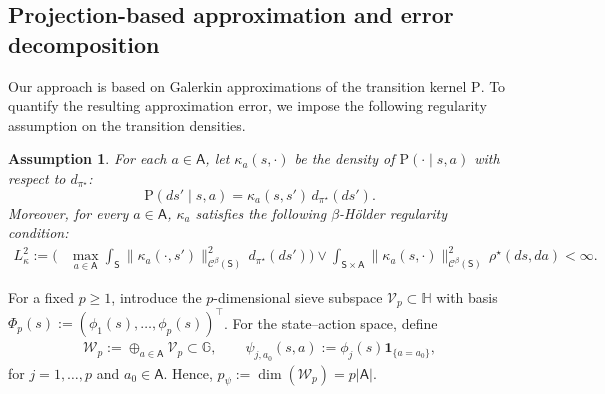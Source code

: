 \documentclass{article}
\theoremstyle{definition}
\theoremstyle{remark}
\theoremstyle{plain}
\newtheorem{assumption}[proposition]{Assumption}
\newcommand{\MKQ}{\mathrm{P}}
\newcommand{\dsieve}{p}
\newcommand{\dsievepsi}{p_{\psi}}
\numberwithin{equation}{section}
\begin{document}
\subsection{Projection-based approximation and error decomposition}
\label{subsec:projection-based-method}
Our approach is based on Galerkin approximations of the transition kernel
\(\MKQ\). To quantify the resulting approximation error, we impose the
following regularity assumption on the transition densities.
\begin{assumption}
\label{assum:kernel_smoothness}
    For each \(a\in\mathsf A\), let \(\kappa_a(s,\cdot)\) be the density of \(\MKQ(\cdot\mid s,a)\) with respect to \(d_{\pi^\star}\):
    \[
        \MKQ(ds'\mid s,a)
        =
        \kappa_a(s,s')\,d_{\pi^\star}(ds').
    \]
   Moreover, for every \(a\in\mathsf{A}\), \(\kappa_a\) satisfies the following \(\beta\)-Hölder regularity condition:
    \begin{align}
    \label{eq:kernel-output-smoothness}
        L_\kappa^2
:=
\Big(
    &\max_{a\in\mathsf A}
    \int_{\mathsf S}
    \|\kappa_a(\cdot,s')\|_{\mathcal C^\beta(\mathsf S)}^2
    \,d_{\pi^\star}(ds')\Big)\vee
    \int_{\mathsf S\times\mathsf A}
    \|\kappa_a(s,\cdot)\|_{\mathcal C^\beta(\mathsf S)}^2
    \,\rho^\star(ds, da)
<\infty.
\end{align}
\end{assumption}
For a fixed \(\dsieve\geq1\), introduce the \(\dsieve\)-dimensional sieve subspace
\(\mathcal V_{\dsieve}\subset\mathbb H\) with basis
\(\Phi_{\dsieve}(s):=(\phi_1(s),\ldots,\phi_{\dsieve}(s))^\top\).
For the state--action space, define
\begin{align}
\label{eq:Psi_definition}
    \mathcal W_{\dsieve}
    :=
    \oplus_{a\in\mathsf A}\mathcal V_{\dsieve}
    \subset\mathbb G,
    \qquad
    \psi_{j,a_0}(s,a)
    :=
    \phi_j(s)\mathbf 1_{\{a=a_0\}},
\end{align}
for \(j=1,\ldots,\dsieve\) and \(a_0\in\mathsf A\). Hence,
\(\dsievepsi:= \dim(\mathcal W_{\dsieve})=\dsieve|\mathsf A|\). 
\end{document}

